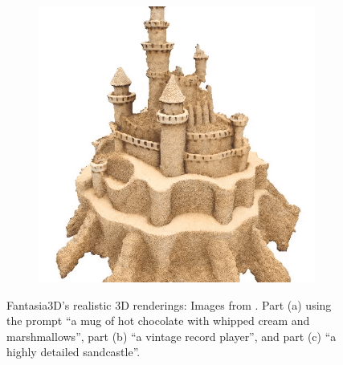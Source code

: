 \begin{figure}[ht]
\begin{subfigure}[b]{0.3\textwidth}
        \caption{}
    \end{subfigure}
    \begin{subfigure}[b]{0.3\textwidth}
        \centering
        \includegraphics[width=\textwidth]{figures/appendix/fantasia_ahighly_detailed_sandcastle.PNG}
        \caption{}
    \end{subfigure}
    \caption{Fantasia3D's realistic 3D renderings: Images from \citep{chen2023fantasia3d}. Part (a) using the prompt ``a mug of hot chocolate with whipped cream and marshmallows'', part (b) ``a vintage record player'', and part (c) ``a highly detailed sandcastle''.}\label{fig:fantasia3DOriginal}
\end{figure}

